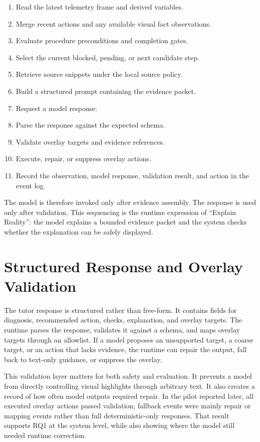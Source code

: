 \begin{enumerate}
\item Read the latest telemetry frame and derived variables.
\item Merge recent actions and any available visual fact observations.
\item Evaluate procedure preconditions and completion gates.
\item Select the current blocked, pending, or next candidate step.
\item Retrieve source snippets under the local source policy.
\item Build a structured prompt containing the evidence packet.
\item Request a model response.
\item Parse the response against the expected schema.
\item Validate overlay targets and evidence references.
\item Execute, repair, or suppress overlay actions.
\item Record the observation, model response, validation result, and action in
the event log.
\end{enumerate}

The model is therefore invoked only after evidence assembly. The response is
used only after validation. This sequencing is the runtime expression of
``Explain Reality'': the model explains a bounded evidence packet and the
system checks whether the explanation can be safely displayed.

\section{Structured Response and Overlay Validation}\label{sec:design-validation}

The tutor response is structured rather than free-form. It contains fields for
diagnosis, recommended action, checks, explanation, and overlay targets. The
runtime parses the response, validates it against a schema, and maps overlay
targets through an allowlist. If a model proposes an unsupported target, a
coarse target, or an action that lacks evidence, the runtime can repair the
output, fall back to text-only guidance, or suppress the overlay.

This validation layer matters for both safety and evaluation. It prevents a
model from directly controlling visual highlights through arbitrary text. It
also creates a record of how often model outputs required repair. In the pilot
reported later, all executed overlay actions passed validation; fallback events
were mainly repair or mapping events rather than full deterministic-only
responses. That result supports RQ1 at the system level, while also showing
where the model still needed runtime correction.

